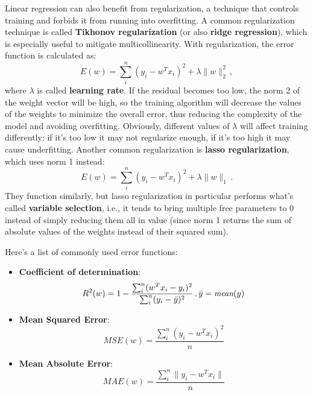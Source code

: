 Linear regression can also benefit from regularization, a technique that controls training and forbids it from running into overfitting. A common regularization technique is called \textbf{Tikhonov regularization} (or also \textbf{ridge regression}), which is especially useful to mitigate multicollinearity. With regularization, the error function is calculated as:
\begin{equation*}
    E(w) = \sum_i^n (y_i - w^Tx_i)^2 + \lambda \|w\|_2^2 \,,
\end{equation*}
where $\lambda$ is called \textbf{learning rate}. If the residual becomes too low, the norm 2 of the weight vector will be high, so the training algorithm will decrease the values of the weights to minimize the overall error, thus reducing the complexity of the model and avoiding overfitting. Obviously, different values of $\lambda$ will affect training differently: if it's too low it may not regularize enough, if it's too high it may cause underfitting. Another common regularization is \textbf{lasso regularization}, which uses norm 1 instead:
\begin{equation*}
    E(w) = \sum_i^n (y_i - w^Tx_i)^2 + \lambda \|w\|_1 \,.
\end{equation*}
They function similarly, but lasso regularization in particular performs what's called \textbf{variable selection}, i.e., it tends to bring multiple free parameters to 0 instead of simply reducing them all in value (since norm 1 returns the sum of absolute values of the weights instead of their squared sum).

Here's a list of commonly used error functions:
\begin{itemize}
    \item \textbf{Coefficient of determination}:
    \begin{equation*}
        R^2(w) = 1 - \dfrac{\sum_i^n (w^Tx_i - y_i)^2}{\sum_i^n (y_i - \Bar{y})^2} \,, \Bar{y} = \textit{mean}(y)
    \end{equation*}

    \item \textbf{Mean Squared Error}:
    \begin{equation*}
        \textit{MSE}(w) = \dfrac{\sum_i^n (y_i - w^T x_i)^2}{n}
    \end{equation*}

    \item \textbf{Mean Absolute Error}:
    \begin{equation*}
        \textit{MAE}(w) = \dfrac{\sum_i^n \|y_i - w^T x_i\|}{n}
    \end{equation*}
\end{itemize}


